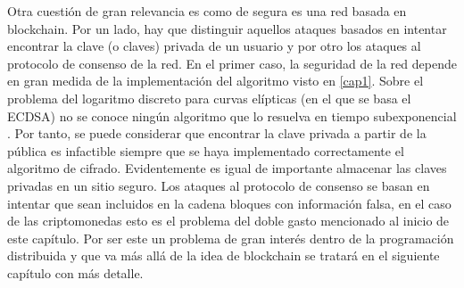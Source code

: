 Otra cuestión de gran relevancia es como de segura es una red basada en blockchain. Por un lado, hay que distinguir aquellos ataques basados en intentar encontrar la clave (o claves) privada de un usuario  y por otro los ataques al protocolo de consenso de la red. En el primer caso, la seguridad de la red depende en gran medida de la implementación del algoritmo visto en \ref{cap1}. Sobre el problema del logaritmo discreto para curvas elípticas (en el que se basa el ECDSA) no se conoce ningún algoritmo que lo resuelva en tiempo subexponencial \citep{discrete_log}. Por tanto, se puede considerar que encontrar la clave privada a partir de la pública es infactible siempre que se haya implementado correctamente el algoritmo de cifrado. Evidentemente es igual de importante almacenar las claves privadas en un sitio seguro.
Los ataques al protocolo de consenso se basan en intentar que sean incluidos en la cadena bloques con información falsa, en el caso de las criptomonedas esto es el problema del doble gasto mencionado al inicio de este capítulo. Por ser este un problema de gran interés dentro de la programación distribuida y que va más allá de la idea de blockchain se tratará en el siguiente capítulo con más detalle.  %